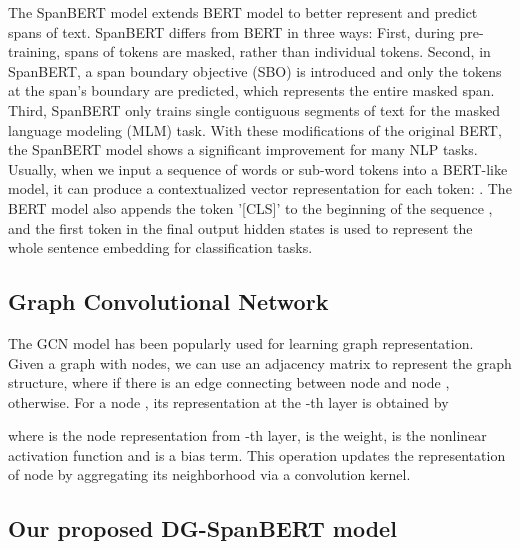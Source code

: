 \documentclass{article}
\begin{document}
The SpanBERT model \cite{joshi2019spanbert} extends BERT model \cite{devlin_bert} to better represent and predict spans of text. SpanBERT differs from BERT in three ways: First, during pre-training, spans of tokens are masked, rather than  individual tokens. Second, in SpanBERT, a span boundary objective (SBO) is introduced and only the tokens at the span's boundary are predicted, which represents the entire masked span. Third, SpanBERT only trains single contiguous segments of text for the masked language modeling (MLM) task. With these modifications of the original BERT, the SpanBERT model shows a significant improvement for many NLP tasks. Usually, when we input a sequence of words or sub-word tokens  into a BERT-like model, it can produce a contextualized vector representation for each token: . The BERT model also appends the token '[CLS]' to the beginning of the sequence , and the first token in the final output hidden states is used to represent the whole sentence embedding for classification tasks.

\subsection{Graph Convolutional Network}

The GCN model \cite{kipf2016semi} has been popularly used for learning  graph representation. Given a graph with  nodes, we can use an  adjacency matrix  to represent the graph structure, where  if there is an edge connecting between node  and node ,  otherwise.  For a node , its representation  at the -th layer is obtained by 

where  is the node representation from -th layer,  is the weight,  is the nonlinear activation function and  is a bias term. This operation updates the representation of node  by aggregating its neighborhood  via a convolution kernel. \subsection{Our proposed  DG-SpanBERT model}
\end{document}
